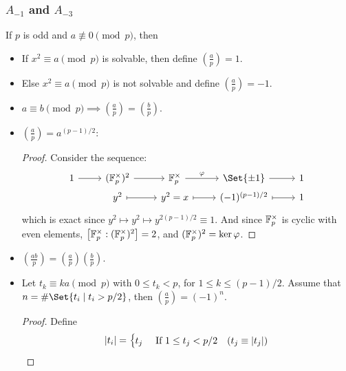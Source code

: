 \subsubsection{$A_{-1}$ and $A_{-3}$}

\begin{definition}
  If $p$ is odd and $a \not\equiv 0 \pmod{p}$, then
  \begin{itemize}
    \item If $x^2 \equiv a \pmod{p}$ is solvable, then define $\left( \frac{a}{p} \right) = 1$.
    \item Else $x^2 \equiv a \pmod{p}$ is not solvable and define $\left( \frac{a}{p} \right) = -1$.
  \end{itemize}
\end{definition}

\begin{prop} \hfill
  \begin{itemize}
    \item $a \equiv b \pmod{p} \implies \left( \frac{a}{p} \right) = \left( \frac{b}{p} \right)$.
    \item $\left( \frac{a}{p} \right) = a^{(p-1)/2}$:
      \begin{proof}
      Consider the sequence:
      \[ \begin{tikzcd}[row sep = 0]
          1 \ar[r] & (\Fb_p^\times)^2 \ar[r] & \Fb_p^\times \ar[r, "\varphi"] & \Set{\pm 1} \ar[r] & 1 \\
          & y^2 \ar[r, mapsto] & y^2=x \ar[r, mapsto] & (-1)^{(p-1)/2} \ar[r, mapsto] & 1 \\
      \end{tikzcd} \]
      which is exact since $y^2 \mapsto y^2 \mapsto y^{2 (p-1)/2} \equiv 1$.
      And since $\mathbb{F}_p^\times$ is cyclic with even elements,
      $\big[\mathbb{F}_p^\times: (\mathbb{F}_p^\times)^2 \big] = 2$, and $(\mathbb{F}_p^\times)^2 = \ker \varphi$.
      \end{proof}
    \item $\left( \frac{ab}{p} \right) = \left( \frac{a}{p} \right) \left( \frac{b}{p} \right)$.
    \item Let $t_k \equiv ka \pmod{p}$ with $0 \leq t_k < p$, for $1 \leq k \leq (p-1)/2$.
      Assume that $n = \# \Set{t_i \mid t_i > p/2}$, then $\left(\frac{a}{p}\right) = (-1)^n$.
      \begin{proof}
        Define
        \[ \lvert t_i\rvert = \begin{cases}
            t_j & \text{ If } 1 \leq t_j < p/2 \quad (t_j \equiv \lvert t_j\rvert) \\

\end{cases}\]
\end{proof}
\end{itemize}
\end{prop}
